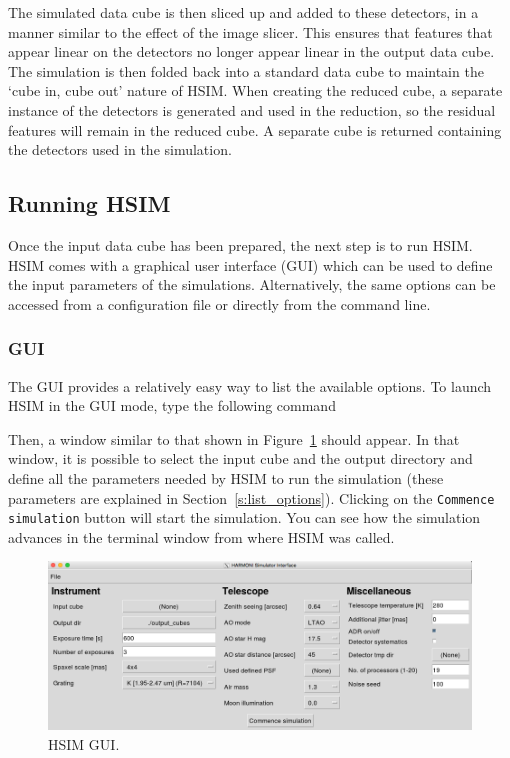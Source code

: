 \documentclass[12pt]{report}
\begin{document}
The simulated data cube is then sliced up and added to these detectors, in a manner similar to the effect of the image slicer. This ensures that features that appear linear on the detectors no longer appear linear in the output data cube. The simulation is then folded back into a standard data cube to maintain the `cube in, cube out' nature of HSIM. When creating the reduced cube, a separate instance of the detectors is generated and used in the reduction, so the residual features will remain in the reduced cube. A separate cube is returned containing the detectors used in the simulation.

\subsection{Running HSIM}

Once the input data cube has been prepared, the next step is to run HSIM. HSIM comes with a graphical user interface (GUI) which can be used to define the input parameters of the simulations. Alternatively, the same options can be accessed from a configuration file or directly from the command line.

\subsubsection{GUI}

The GUI provides a relatively easy way to list the available options. To launch HSIM in the GUI mode, type the following command\\


Then, a window similar to that shown in Figure~\ref{fig:hsimgui} should appear. In that window, it is possible to select the input cube and the output directory and define all the parameters needed by HSIM to run the simulation (these parameters are explained in Section~\ref{s:list_options}). Clicking on the \texttt{Commence simulation} button will start the simulation. You can see how the simulation advances in the terminal window from where HSIM was called.

\begin{figure}[!h]
\centering
\includegraphics[width=\textwidth]{HSIM_GUI.png}
\caption{\small HSIM GUI.}\label{fig:hsimgui}
\end{figure}
\end{document}
